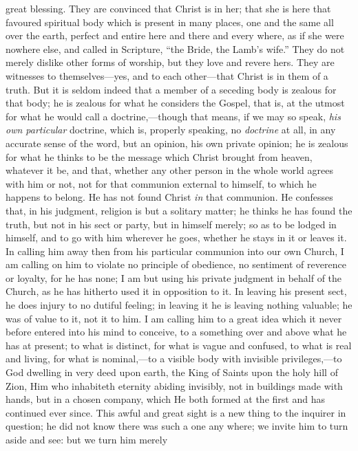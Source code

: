 great blessing. They are convinced that Christ is in her; that she is
here that favoured spiritual body which is present in many places, one
and the same all over the earth, perfect and entire here and there and
every where, as if she were nowhere else, and called in Scripture,
``the Bride, the Lamb's wife.'' They do not merely dislike
other forms of worship, but they love and revere hers. They are
witnesses to themselves—yes, and to each other—that Christ is in
them of a truth. But it is seldom indeed that a member of a seceding
body is zealous for that body; he is zealous for what he considers the
Gospel, that is, at the utmost for what he would call a doctrine,—though
that means, if we may so speak, \emph{his own particular} doctrine,
which is, properly speaking, no \emph{doctrine} at all, in any
accurate sense of the word, but an opinion, his own private opinion;
he is zealous for what he thinks to be the message which Christ
brought from heaven, whatever it be, and that, whether any other
person in the whole world agrees with him or not, not for that
communion external to himself, to which he happens to belong. He has
not found Christ \emph{in} that communion. He confesses that, in his
judgment, religion is but a solitary matter; he thinks he has found
the truth, but not in his sect or party, but in himself merely; so as
to be lodged in himself, and to go with him wherever he goes, whether
he stays in it or leaves it. In calling him away then from his
particular communion into our own Church, I am calling on him to
violate no principle of obedience, no sentiment of reverence or
loyalty, for he has none; I am but using his private judgment in
behalf of the Church, as he has hitherto used it in opposition to it.
In leaving his present sect, he does injury to no dutiful feeling; in
leaving it he is leaving nothing valuable; he was of value to it, not
it to him. I am calling him to a great idea which it never before
entered into his mind to conceive, to a something over and above what
he has at present; to what is distinct, for what is vague and
confused, to what is real and living, for what is nominal,—to a
visible body with invisible privileges,—to God dwelling in very deed
upon earth, the King of Saints upon the holy hill of Zion, Him who
inhabiteth eternity abiding invisibly, not in buildings made with
hands, but in a chosen company, which He both formed at the first and
has continued ever since. This awful and great sight is a new thing to
the inquirer in question; he did not know there was such a one any
where; we invite him to turn aside and see: but we turn him merely
